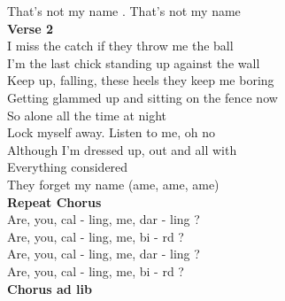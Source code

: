 That's not my name . That's not my name \\
\textbf{Verse 2}\\
I miss the catch if they throw me the ball \\
I'm the last chick standing up against the wall \\
Keep up, falling, these heels they keep me boring \\
Getting glammed up and sitting on the fence now \\
So alone all the time at night \\
Lock myself away. Listen to me, oh no \\
Although I'm dressed up, out and all with \\
Everything considered\\
They forget my name (ame, ame, ame) \\
\textbf{Repeat Chorus}\\
Are, you, cal - ling, me, dar - ling ? \\
Are, you, cal - ling, me, bi - rd ? \\
Are, you, cal - ling, me, dar - ling ? \\
Are, you, cal - ling, me, bi - rd ? \\
\textbf{Chorus ad lib}


